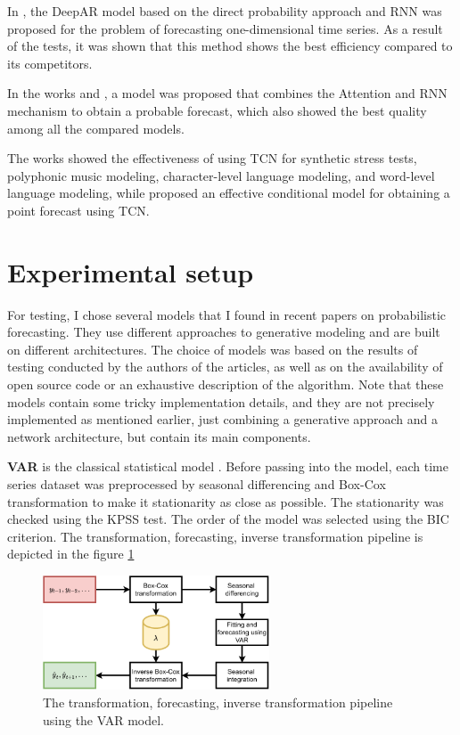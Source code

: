 \documentclass[12pt,a4paper]{article}
\begin{document}
In \cite{deepar}, the DeepAR model based on the direct probability approach and RNN was proposed for the problem of forecasting one-dimensional time series. As a result of the tests, it was shown that this method shows the best efficiency compared to its competitors.

In the works \cite{multihorizon} and \cite{interpr}, a model was proposed that combines the Attention and RNN mechanism to obtain a probable forecast, which also showed the best quality among all the compared models.

The works \cite{BaiTCN2018} showed the effectiveness of using TCN for synthetic stress tests, polyphonic music modeling, character-level language modeling, and word-level language modeling, while \cite{borovykh2018conditional} proposed an effective conditional model for obtaining a point forecast using TCN.

\section{Experimental setup}

For testing, I chose several models that I found in recent papers on probabilistic forecasting. They use different approaches to generative modeling and are built on different architectures. The choice of models was based on the results of testing conducted by the authors of the articles, as well as on the availability of open source code or an exhaustive description of the algorithm. Note that these models contain some tricky implementation details, and they are not precisely implemented as mentioned earlier, just combining a generative approach and a network architecture, but contain its main components.

\textbf{VAR} is the classical statistical model \cite{fpp3}. Before passing into the model, each time series dataset was preprocessed by seasonal differencing and Box-Cox transformation to make it stationarity as close as possible. The stationarity was checked using the KPSS test. The order of the model was selected using the BIC criterion. The transformation, forecasting, inverse transformation pipeline is depicted in the figure \ref{fig:transformation_var}

\begin{figure}[!ht]
    \centering
    \includegraphics[width=0.6\textwidth]{transformation_var.pdf}
    \caption{The transformation, forecasting, inverse transformation pipeline using the VAR model.}
    \label{fig:transformation_var}
\end{figure}
\end{document}
